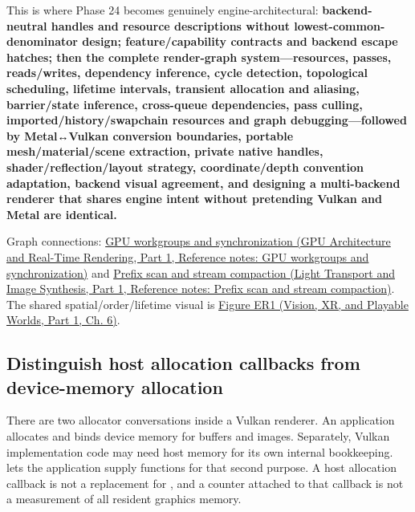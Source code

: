 This is where Phase 24 becomes genuinely engine-architectural: \textbf{backend-neutral handles and resource descriptions without lowest-common-denominator design; feature/capability contracts and backend escape hatches; then the complete render-graph system---resources, passes, reads/writes, dependency inference, cycle detection, topological scheduling, lifetime intervals, transient allocation and aliasing, barrier/state inference, cross-queue dependencies, pass culling, imported/history/swapchain resources and graph debugging---followed by Metal↔Vulkan conversion boundaries, portable mesh/material/scene extraction, private native handles, shader/reflection/layout strategy, coordinate/depth convention adaptation, backend visual agreement, and designing a multi-backend renderer that shares engine intent without pretending Vulkan and Metal are identical.}

Graph connections: \href{../06-GPU-Architecture-and-Real-Time-Rendering-P01/main.pdf\#nameddest=appendix-f662b5b1773b}{GPU workgroups and synchronization (GPU Architecture and Real-Time Rendering, Part 1, Reference notes: GPU workgroups and synchronization)} and \href{../04-Light-Transport-and-Image-Synthesis-P01/main.pdf\#nameddest=appendix-f2ee4d086415}{Prefix scan and stream compaction (Light Transport and Image Synthesis, Part 1, Reference notes: Prefix scan and stream compaction)}. The shared spatial/order/lifetime visual is \href{../07-Vision-XR-and-Playable-Worlds-P01/main.pdf\#nameddest=04-visual-computing-ii-ch037-figure-er1---footprint-compositing-order-and-storage-lifetime}{Figure ER1 (Vision, XR, and Playable Worlds, Part 1, Ch. 6)}.

\subsection{Distinguish host allocation callbacks from device-memory allocation}\label{05-engine-i-ch024-distinguish-host-allocation-callbacks-from-device-memory-allocation}

\hypertarget{05-engine-i-ch024-distinguish-host-allocation-callbacks-from-device-memory-allocation}{}

There are two allocator conversations inside a Vulkan renderer. An application allocates and binds device memory for buffers and images. Separately, Vulkan implementation code may need host memory for its own internal bookkeeping.  lets the application supply functions for that second purpose. A host allocation callback is not a replacement for , and a counter attached to that callback is not a measurement of all resident graphics memory.

